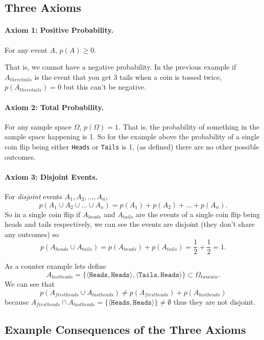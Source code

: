 \subsection{Three Axioms}

\paragraph{Axiom 1: Positive Probability.}
For any event $A$, $p(A)\ge 0$.

That is, we cannot have a negative probability. 
In the previous example if $A_{threetails}$ is the event that you get 3 tails when a coin is tossed twice, 
$p(A_{threetails})=0$ but this can't be negative.

\paragraph{Axiom 2: Total Probability.}
For any sample space $\Omega$, $p(\Omega)=1$. 
That is, the probability of something in the sample space happening is 1. 
So for the example above the probability of a single coin flip being either \texttt{Heads} or \texttt{Tails} is 1, 
(as defined) there are no other possible outcomes. 

\paragraph{Axiom 3: Disjoint Events.}
For \textit{disjoint} events $A_1, A_2, ..., A_n$, \[p(A_1\cup A_2\cup ... \cup A_n)=p(A_1) + p(A_2) + ... + p(A_n).\]
So in a single coin flip if $A_{heads}$ and $A_{tails}$ are the events of a single coin flip being heads and tails respectively, 
we can see the events are disjoint (they don't share any outcomes)
so \[p(A_{heads} \cup A_{tails}) = p(A_{heads}) + p(A_{tails}) = \frac{1}{2} + \frac{1}{2} = 1.\]

As a counter example lets define \[A_{lastheads}=\{
\langle\texttt{Heads},\texttt{Heads}\rangle,
\langle\texttt{Tails},\texttt{Heads}\rangle\} \subset \Omega_{twocoin}. \]
We can see that 
\[p(A_{firstheads} \cup A_{lastheads}) \ne p(A_{firstheads}) + p(A_{lastheads})\]
because $A_{firstheads} \cap A_{lastheads} = \{\langle\texttt{Heads},\texttt{Heads}\rangle\} \ne \emptyset$ thus they are not disjoint.


\subsection{Example Consequences of the Three Axioms}

